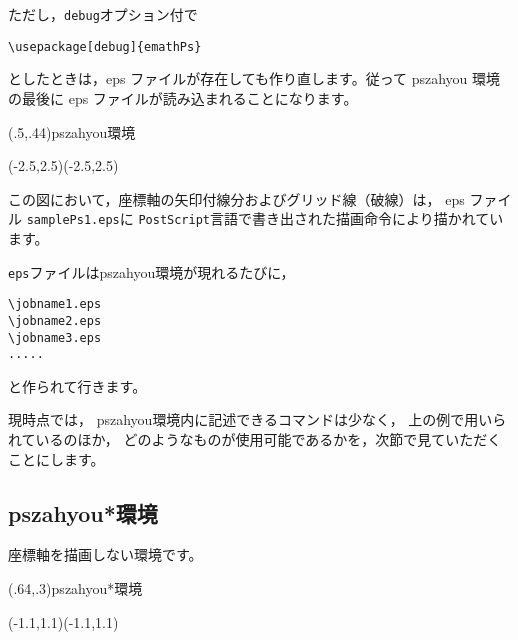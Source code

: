 \documentclass[a4j]{jarticle}
\begin{document}
ただし，\texttt{debug}オプション付で
\begin{jquote}
\begin{verbatim}
\usepackage[debug]{emathPs}
\end{verbatim}
\end{jquote}
としたときは，eps ファイルが存在しても作り直します。従って \textsf{pszahyou}
環境の最後に eps ファイルが読み込まれることになります。

\begin{showEx}(.5,.44){\textsf{pszahyou}環境}
\begin{pszahyou}[ul=8mm]%
    (-2.5,2.5)(-2.5,2.5)
  \zahyouMemori[g]
\end{pszahyou}
\end{showEx}

この図において，座標軸の矢印付線分およびグリッド線（破線）は，
eps ファイル \texttt{samplePs1.eps}に 
\texttt{PostScript}言語で書き出された描画命令により描かれています。

\texttt{eps}ファイルは\textsf{pszahyou}環境が現れるたびに，
\begin{jquote}
\begin{verbatim}
\jobname1.eps
\jobname2.eps
\jobname3.eps
.....
\end{verbatim}
\end{jquote}
と作られて行きます。

現時点では，
\textsf{pszahyou}環境内に記述できるコマンドは少なく，
上の例で用いられているのほか，
どのようなものが使用可能であるかを，次節で見ていただくことにします。

\subsection{\textsf{pszahyou*}環境}
座標軸を描画しない環境です。

\begin{showEx}(.64,.3){\textsf{pszahyou*}環境}
\begin{pszahyou*}[ul=10mm]%
    (-1.1,1.1)(-1.1,1.1)
  \Takakkei{\A\B\C\D\E\F}
\end{pszahyou*}
\end{showEx}


\end{document}
